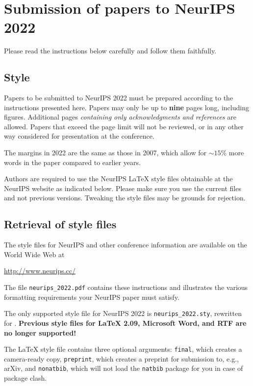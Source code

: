 \documentclass{article}
\begin{document}
\medskip




\section{Submission of papers to NeurIPS 2022}


Please read the instructions below carefully and follow them faithfully.


\subsection{Style}


Papers to be submitted to NeurIPS 2022 must be prepared according to the
instructions presented here. Papers may only be up to {\bf nine} pages long,
including figures. Additional pages \emph{containing only acknowledgments and
references} are allowed. Papers that exceed the page limit will not be
reviewed, or in any other way considered for presentation at the conference.


The margins in 2022 are the same as those in 2007, which allow for $\sim$$15\%$
more words in the paper compared to earlier years.

Authors are required to use the NeurIPS \LaTeX{} style files obtainable at the
NeurIPS website as indicated below. Please make sure you use the current files
and not previous versions. Tweaking the style files may be grounds for
rejection.


\subsection{Retrieval of style files}


The style files for NeurIPS and other conference information are available on
the World Wide Web at
\begin{center}
  \url{http://www.neurips.cc/}
\end{center}
The file \verb+neurips_2022.pdf+ contains these instructions and illustrates the
various formatting requirements your NeurIPS paper must satisfy.


The only supported style file for NeurIPS 2022 is \verb+neurips_2022.sty+,
rewritten for \LaTeXe{}.  \textbf{Previous style files for \LaTeX{} 2.09,
  Microsoft Word, and RTF are no longer supported!}


The \LaTeX{} style file contains three optional arguments: \verb+final+, which
creates a camera-ready copy, \verb+preprint+, which creates a preprint for
submission to, e.g., arXiv, and \verb+nonatbib+, which will not load the
\verb+natbib+ package for you in case of package clash.
\end{document}
